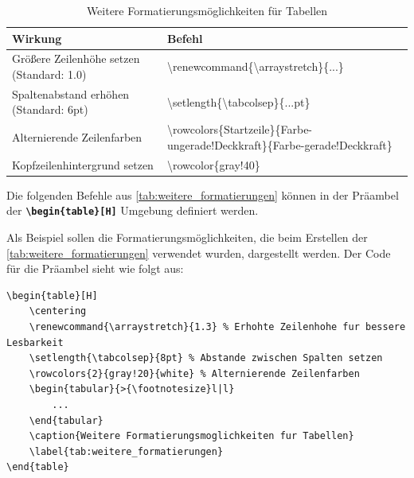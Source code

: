 \begin{table}[H]
    \centering
    \renewcommand{\arraystretch}{1.3} %
    \setlength{\tabcolsep}{8pt} %
    \begin{tabular}{>{\footnotesize}l|l}
        \toprule
        \rowcolor{gray!40} %
        \textbf{Wirkung}                          & \textbf{Befehl}                                                                                           \\
        \midrule
        Größere Zeilenhöhe setzen (Standard: 1.0) & \textbackslash renewcommand\{\textbackslash arraystretch\}\{...\}                                         \\
        Spaltenabstand erhöhen (Standard: 6pt)    & \textbackslash setlength\{\textbackslash tabcolsep\}\{...pt\}                                             \\
        Alternierende Zeilenfarben                & \scriptsize{\textbackslash rowcolors\{Startzeile\}\{Farbe-ungerade!Deckkraft\}\{Farbe-gerade!Deckkraft\}} \\
        Kopfzeilenhintergrund setzen              & \textbackslash rowcolor\{gray!40\}                                                                        \\
        \bottomrule
    \end{tabular}
    \caption{Weitere Formatierungsmöglichkeiten für Tabellen}
    \label{tab:weitere_formatierungen}
\end{table}

Die folgenden Befehle aus \autoref{tab:weitere_formatierungen} können in der Präambel der \texttt{\textbf{\textbackslash begin\{table\}[H]}} Umgebung definiert werden.

Als Beispiel sollen die Formatierungsmöglichkeiten, die beim Erstellen der \autoref{tab:weitere_formatierungen} verwendet wurden, dargestellt werden.
Der Code für die Präambel sieht wie folgt aus:

\begin{lstlisting}[language={[LaTeX]TeX}, basicstyle=\small]
\begin{table}[H]
    \centering
    \renewcommand{\arraystretch}{1.3} % Erhohte Zeilenhohe fur bessere Lesbarkeit
    \setlength{\tabcolsep}{8pt} % Abstande zwischen Spalten setzen
    \rowcolors{2}{gray!20}{white} % Alternierende Zeilenfarben
    \begin{tabular}{>{\footnotesize}l|l}
        ...
    \end{tabular}
    \caption{Weitere Formatierungsmoglichkeiten fur Tabellen}
    \label{tab:weitere_formatierungen}
\end{table}
\end{lstlisting}



